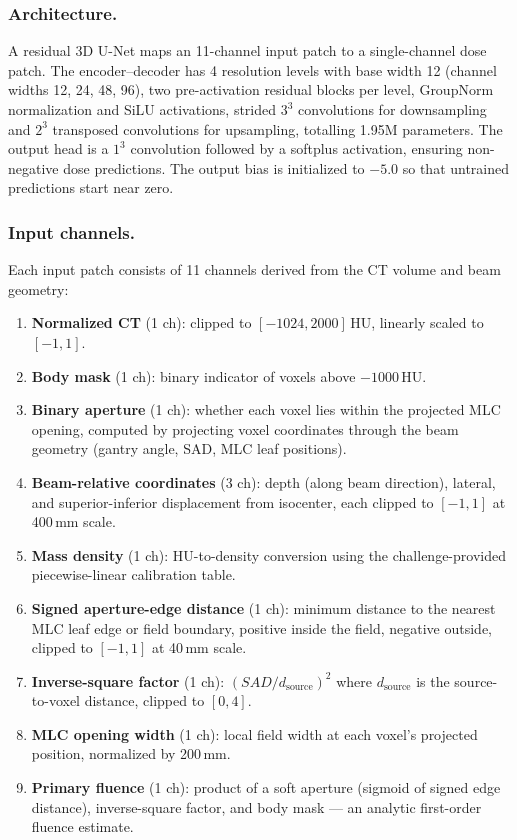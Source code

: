 \documentclass[runningheads]{llncs}
\begin{document}
\subsubsection{Architecture.}
A residual 3D U-Net \cite{unet,unet3d} maps an 11-channel input patch to a single-channel dose patch. The encoder--decoder has 4 resolution levels with base width 12 (channel widths 12, 24, 48, 96), two pre-activation residual blocks per level, GroupNorm normalization and SiLU activations, strided $3^3$ convolutions for downsampling and $2^3$ transposed convolutions for upsampling, totalling 1.95M parameters. The output head is a $1^3$ convolution followed by a softplus activation, ensuring non-negative dose predictions. The output bias is initialized to $-5.0$ so that untrained predictions start near zero.

\subsubsection{Input channels.}
Each input patch consists of 11 channels derived from the CT volume and beam geometry:
\begin{enumerate}
\item \textbf{Normalized CT} (1 ch): clipped to $[-1024, 2000]$\,HU, linearly scaled to $[-1, 1]$.
\item \textbf{Body mask} (1 ch): binary indicator of voxels above $-1000$\,HU.
\item \textbf{Binary aperture} (1 ch): whether each voxel lies within the projected MLC opening, computed by projecting voxel coordinates through the beam geometry (gantry angle, SAD, MLC leaf positions).
\item \textbf{Beam-relative coordinates} (3 ch): depth (along beam direction), lateral, and superior-inferior displacement from isocenter, each clipped to $[-1, 1]$ at 400\,mm scale.
\item \textbf{Mass density} (1 ch): HU-to-density conversion using the challenge-provided piecewise-linear calibration table.
\item \textbf{Signed aperture-edge distance} (1 ch): minimum distance to the nearest MLC leaf edge or field boundary, positive inside the field, negative outside, clipped to $[-1, 1]$ at 40\,mm scale.
\item \textbf{Inverse-square factor} (1 ch): $(SAD / d_{\mathrm{source}})^2$ where $d_{\mathrm{source}}$ is the source-to-voxel distance, clipped to $[0, 4]$.
\item \textbf{MLC opening width} (1 ch): local field width at each voxel's projected position, normalized by 200\,mm.
\item \textbf{Primary fluence} (1 ch): product of a soft aperture (sigmoid of signed edge distance), inverse-square factor, and body mask --- an analytic first-order fluence estimate.
\end{enumerate}
\end{document}
